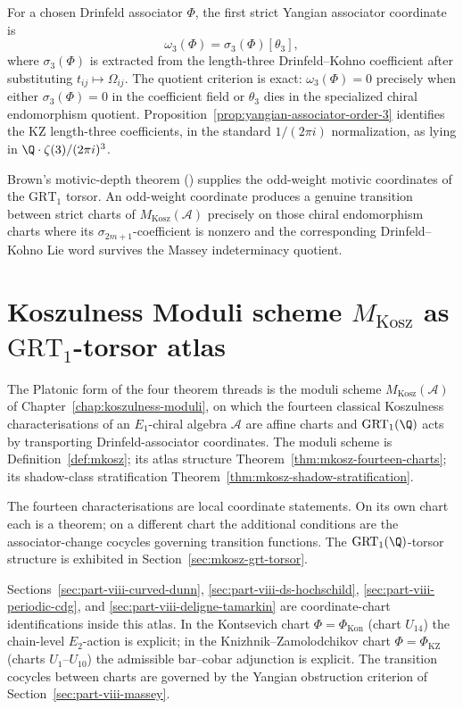 For a chosen Drinfeld associator \(\Phi\), the first strict
Yangian associator coordinate is
\[
\omega_3(\Phi)=\sigma_3(\Phi)[\theta_3],
\]
where \(\sigma_3(\Phi)\) is extracted from the length-three
Drinfeld--Kohno coefficient after substituting
\(t_{ij}\mapsto\Omega_{ij}\). The quotient criterion is exact:
\(\omega_3(\Phi)=0\) precisely when either
\(\sigma_3(\Phi)=0\) in the coefficient field or
\(\theta_3\) dies in the specialized chiral endomorphism quotient.
Proposition~\ref{prop:yangian-associator-order-3} identifies the KZ
length-three coefficients, in the standard \(1/(2\pi i)\)
normalization, as lying in
\(\Q\cdot\zeta(3)/(2\pi i)^3\).

Brown's motivic-depth theorem (\cite{BrownMixedTate}) supplies the
odd-weight motivic coordinates of the $\mathrm{GRT}_{1}$ torsor.
An odd-weight coordinate produces a genuine transition between strict
charts of \(M_{\mathrm{Kosz}}(\mathcal A)\) precisely on those chiral
endomorphism charts where its \(\sigma_{2m+1}\)-coefficient is nonzero
and the corresponding Drinfeld--Kohno Lie word survives the Massey
indeterminacy quotient.

\section{Koszulness Moduli scheme $M_{\mathrm{Kosz}}$ as $\mathrm{GRT}_{1}$-torsor atlas}
\label{sec:part-viii-koszulness-moduli}

The Platonic form of the four theorem threads is the moduli scheme
$M_{\mathrm{Kosz}}(\mathcal{A})$ of Chapter~\ref{chap:koszulness-moduli},
on which the fourteen classical Koszulness characterisations of an
$E_{1}$-chiral algebra $\mathcal{A}$ are affine charts and
$\mathrm{GRT}_{1}(\Q)$ acts by transporting Drinfeld-associator
coordinates. The moduli scheme is Definition~\ref{def:mkosz}; its
atlas structure Theorem~\ref{thm:mkosz-fourteen-charts}; its
shadow-class stratification Theorem~\ref{thm:mkosz-shadow-stratification}.

The fourteen characterisations are local coordinate statements. On
its own chart each is a theorem; on a different chart the additional
conditions are the associator-change cocycles governing transition
functions. The $\mathrm{GRT}_{1}(\Q)$-torsor structure is exhibited in
Section~\ref{sec:mkosz-grt-torsor}.

Sections~\ref{sec:part-viii-curved-dunn},
\ref{sec:part-viii-ds-hochschild},
\ref{sec:part-viii-periodic-cdg}, and
\ref{sec:part-viii-deligne-tamarkin} are coordinate-chart
identifications inside this atlas. In the Kontsevich chart
$\Phi = \Phi_{\mathrm{Kon}}$ (chart $U_{14}$) the chain-level
$E_{2}$-action is explicit; in the Knizhnik--Zamolodchikov chart
$\Phi = \Phi_{\mathrm{KZ}}$ (charts $U_{1}$--$U_{10}$) the admissible
bar--cobar adjunction is explicit. The transition cocycles between
charts are governed by the Yangian obstruction criterion of
Section~\ref{sec:part-viii-massey}.

